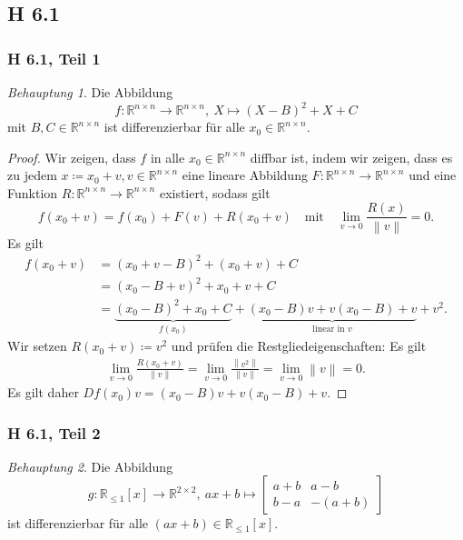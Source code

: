 \documentclass[draft,a5paper]{article}
\theoremstyle{remark}
\newtheorem*{beh}{Behauptung}
\newcommand{\enVert}[1]{\left\lVert#1\right\rVert}
\let\norm=\enVert
\begin{document}
\subsection*{H 6.1}

\subsubsection*{H 6.1, Teil 1}

\begin{beh}
  Die Abbildung
  \[f\colon \mathbb{R}^{n \times n} \to \mathbb{R}^{n \times n},~ X \mapsto (X - B)^{2} + X + C\] mit
  \(B, C \in \mathbb{R}^{n \times n}\) ist differenzierbar für alle
  \(x_{0} \in \mathbb{R}^{n \times n}\).
\end{beh}

\begin{proof}
  Wir zeigen, dass \(f\) in alle \(x_{0} \in \mathbb{R}^{n \times n}\) diffbar ist,
  indem wir zeigen, dass es zu jedem
  \(x \coloneq x_{0} + v, v \in \mathbb{R}^{n \times n}\) eine lineare Abbildung
  \(F \colon \mathbb{R}^{n \times n} \to \mathbb{R}^{n \times n}\) und eine Funktion
  \(R \colon \mathbb{R}^{n \times n} \to \mathbb{R}^{n \times n}\) existiert, sodass gilt
\[ f(x_{0} + v) = f(x_{0}) + F(v) + R(x_{0} + v)
  \quad\text{mit}\quad
  \lim_{v \to 0}{\frac{R(x)}{\enVert{v}}} = 0.
\]
Es gilt
\begin{align*}
  f(x_{0} + v)
  &= (x_{0} + v - B)^{2} + (x_{0} + v) + C \\
  &= (x_{0} - B + v)^{2} + x_{0} + v + C \\
  &= \underbrace{(x_{0} - B)^{2} + x_{0}
    + C}_{f(x_{0})}
    + \underbrace{(x_{0} - B)v + v(x_{0} - B) + v}_{\text{linear in }v}
    + v^{2}.
\end{align*}
Wir setzen \(R(x_{0} + v) \coloneq v^{2}\) und prüfen die
Restgliedeigenschaften: Es gilt
\begin{align*}
  \lim_{v \to 0}{\frac{R(x_{0} + v)}{\norm{v}}} = \lim_{v \to
  0}{\frac{\norm{v^{2}}}{\norm{v}}} = \lim_{v \to 0}{\norm{v}} = 0.
\end{align*}
Es gilt daher \(Df(x_{0})v = (x_{0} - B)v + v(x_{0} - B) + v\).
\end{proof}

\subsubsection*{H 6.1, Teil 2}

\begin{beh}
  Die Abbildung
  \[g\colon \mathbb{R}_{\le 1}[x] \to \mathbb{R}^{2 \times 2},~ ax+b \mapsto
    \begin{bmatrix}
      a + b & a - b \\
      b - a & -(a + b)
    \end{bmatrix}
  \] ist differenzierbar für alle
  \((ax+b) \in \mathbb{R}_{\le 1}[x]\).
\end{beh}
\end{document}
